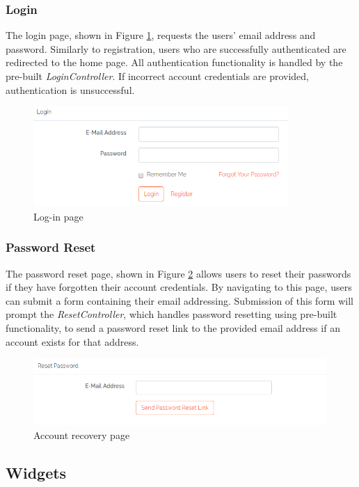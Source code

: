 \subsubsection{Login}
The login page, shown in Figure \ref{fig:LoginPage}, requests the users' email address and password. Similarly to registration, users who are successfully authenticated are redirected to the home page. All authentication functionality is handled by the pre-built \textit{LoginController}. If incorrect account credentials are provided, authentication is unsuccessful.

\begin{figure}[H]
\centering
\includegraphics[height=1.5in]{Images/Design/login-page}
\caption{Log-in page}
\label{fig:LoginPage}
\end{figure}

\subsubsection{Password Reset}
The password reset page, shown in Figure \ref{fig:PasswordReset} allows users to reset their passwords if they have forgotten their account credentials. By navigating to this page, users can submit a form containing their email addressing. Submission of this form will prompt the \textit{ResetController}, which handles password resetting using pre-built functionality, to send a password reset link to the provided email address if an account exists for that address.

\begin{figure}[H]
\centering
\includegraphics[height=1in]{Images/Implementation/PasswordReset}
\caption{Account recovery page}
\label{fig:PasswordReset}
\end{figure}

\subsection{Widgets}

